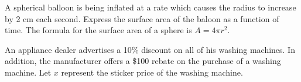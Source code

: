 \documentclass[fleqn,addpoints]{exam}
\begin{document}
\begin{questions}

\question
A spherical balloon is being inflated at a rate which causes the radius to increase by 2 cm each second.  Express the surface area
of the baloon as a function of time.  The formula for the surface area of a sphere is $A = 4 \pi r^2$.

\question
An appliance dealer advertises a 10\% discount on all of his washing machines.  In addition, the manufacturer offers a
\$100 rebate on the purchase of a washing machine.  Let $x$ represent the sticker price of the washing machine.


\end{questions}
\end{document}
